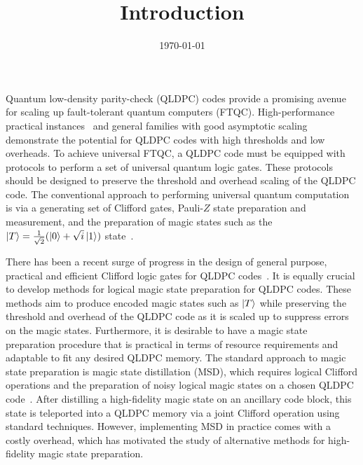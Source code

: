 \documentclass[11pt]{article}
\begin{document}
    \title{Introduction}
    \date{\today}

    \maketitle

\fi


Quantum low-density parity-check (QLDPC) codes provide a promising avenue for scaling up fault-tolerant quantum computers (FTQC). 
High-performance practical instances~\cite{Bravyi2024faulttolerant} and general families with good asymptotic scaling~\cite{panteleev2022asymptotically, dinur2022goodquantumldpccodes, leverrier2022quantum} demonstrate the potential for QLDPC codes with high thresholds and low overheads. 
To achieve universal FTQC, a QLDPC code must be equipped with protocols to perform a set of universal quantum logic gates. 
These protocols should be designed to preserve the threshold and overhead scaling of the QLDPC code. 
The conventional approach to performing universal quantum computation is via a generating set of Clifford gates, Pauli-$Z$ state preparation and measurement, and the preparation of magic states such as the $\ket{T}=\frac{1}{\sqrt{2}}(\ket{0}+\sqrt{i}\ket{1})$ state~\cite{bravyi2005universal}. 

There has been a recent surge of progress in the design of general purpose, practical and efficient Clifford logic gates for QLDPC codes~\cite{cohen2022low,cross2025improvedqldpcsurgerylogical,Ide_2025,williamson2024lowoverheadfaulttolerantquantumcomputation,baspin2025fast,cowtan2025fast,zheng2025high,swaroop2025universaladaptersquantumldpc,Zhang_2025,chang2026constant,tan2025single,li2026transversal}. 
It is equally crucial to develop methods for logical magic state preparation for QLDPC codes. These methods aim to produce encoded magic states such as $\ket{T}$ while preserving the threshold and overhead of the QLDPC code as it is scaled up to suppress errors on the magic states.
Furthermore, it is desirable to have a magic state preparation procedure that is practical in terms of resource requirements and adaptable to fit any desired QLDPC memory. 
The standard approach to magic state preparation is magic state distillation (MSD), which requires logical Clifford operations and the preparation of noisy logical magic states on a chosen QLDPC code~\cite{knill2004faulttolerantpostselectedquantumcomputation, bravyi2005universal, meier2012magicstatedistillationfourqubitcode, Campbell_2017}.
After distilling a high-fidelity magic state on an ancillary code block, this state is teleported into a QLDPC memory via a joint Clifford operation using standard techniques. 
However, implementing MSD in practice comes with a costly overhead, which has motivated the study of alternative methods for high-fidelity magic state preparation.
\end{document}
